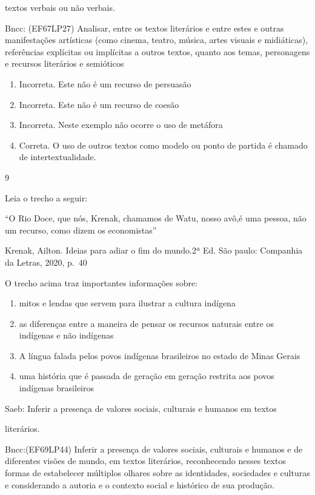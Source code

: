 {{\begin{itemize}
\begin{itemize}
textos verbais ou não verbais.

Bncc: (EF67LP27) Analisar, entre os textos literários e entre estes e
outras manifestações artísticas (como cinema, teatro, música, artes
visuais e midiáticas), referências explícitas ou implícitas a outros
textos, quanto aos temas, personagens e recursos literários e semióticos

\begin{enumerate}
\def\labelenumi{\arabic{enumi}.}
\item
  Incorreta. Este não é um recurso de persuasão
\item
  Incorreta. Este não é um recurso de coesão
\item
  Incorreta. Neste exemplo não ocorre o uso de metáfora
\item
  Correta. O uso de outros textos como modelo ou ponto de partida é
  chamado de intertextualidade.
\end{enumerate}

\num{9}

Leia o trecho a seguir:

``O Rio Doce, que nós, Krenak, chamamos de Watu, nosso avô,é uma pessoa,
não um recurso, como dizem os economistas''

Krenak, Ailton. Ideias para adiar o fim do mundo.2ª Ed. São paulo:
Companhia da Letras, 2020, p.~40

O trecho acima traz importantes informações sobre:

\begin{enumerate}
\def\labelenumi{\alph{enumi})}
\item
  mitos e lendas que servem para ilustrar a cultura indígena
\item
  as diferenças entre a maneira de pensar os recursos naturais entre os
  indígenas e não indígenas
\item
  A língua falada pelos povos indígenas brasileiros no estado de Minas
  Gerais
\item
  uma história que é passada de geração em geração restrita aos povos
  indígenas brasileiros
\end{enumerate}

Saeb: Inferir a presença de valores sociais, culturais e humanos em
textos

literários.

Bncc:(EF69LP44) Inferir a presença de valores sociais, culturais e
humanos e de diferentes visões de mundo, em textos literários,
reconhecendo nesses textos formas de estabelecer múltiplos olhares sobre
as identidades, sociedades e culturas e considerando a autoria e o
contexto social e histórico de sua produção.


\end{itemize}
\end{itemize}}}
